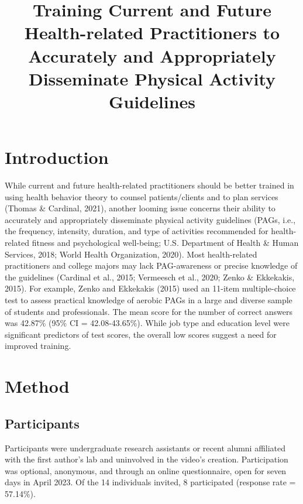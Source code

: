 \documentclass[
  man,
  longtable,
  nolmodern,
  notxfonts,
  notimes,
  colorlinks=true,linkcolor=blue,citecolor=blue,urlcolor=blue]{apa7}
\title{Training Current and Future Health-related Practitioners to
Accurately and Appropriately Disseminate Physical Activity Guidelines}
\begin{document}
\maketitle


\setcounter{secnumdepth}{-\maxdimen} %

\setlength\LTleft{0pt}


\section{Introduction}\label{introduction}

While current and future health-related practitioners should be better
trained in using health behavior theory to counsel patients/clients and
to plan services (Thomas \& Cardinal, 2021), another looming issue
concerns their ability to accurately and appropriately disseminate
physical activity guidelines (PAGs, i.e., the frequency, intensity,
duration, and type of activities recommended for health-related fitness
and psychological well-being; U.S. Department of Health \& Human
Services, 2018; World Health Organization, 2020). Most health-related
practitioners and college majors may lack PAG-awareness or precise
knowledge of the guidelines (Cardinal et al., 2015; Vermeesch et al.,
2020; Zenko \& Ekkekakis, 2015). For example, Zenko and Ekkekakis (2015)
used an 11-item multiple-choice test to assess practical knowledge of
aerobic PAGs in a large and diverse sample of students and
professionals. The mean score for the number of correct answers was
42.87\% (95\% CI = 42.08-43.65\%). While job type and education level
were significant predictors of test scores, the overall low scores
suggest a need for improved training.

\section{Method}\label{method}

\subsection{Participants}\label{participants}

Participants were undergraduate research assistants or recent alumni
affiliated with the first author's lab and uninvolved in the video's
creation. Participation was optional, anonymous, and through an online
questionnaire, open for seven days in April 2023. Of the 14 individuals
invited, 8 participated (response rate = 57.14\%).
\end{document}
